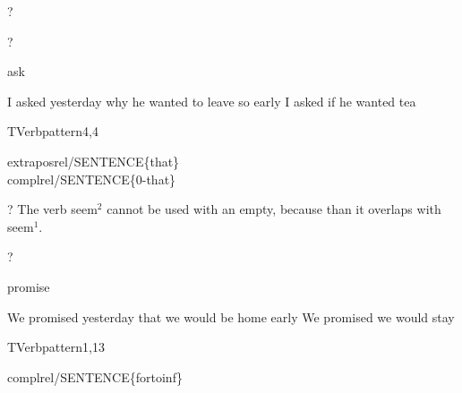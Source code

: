 \begin{thetadescr}
\evitem ?
\esitem
     \begin{examples}
        \example  ?
     \end{examples}
\end{thetadescr}


\begin{thetadescr}
\evitem ask
\esitem
     \begin{examples}
        \example I asked yesterday why he wanted to leave so early
        \example I asked if he wanted tea
     \end{examples}
\end{thetadescr}


\newpage
{}
\begin{vpattern}
 TVerbpattern4,4
\csritem \mbox{}\\
     \begin{csr}
     extraposrel/SENTENCE\{that\}\\
     complrel/SENTENCE\{0-that\}
     \end{csr}
\remarksitem
\end{vpattern}


\begin{thetadescr}
\evitem ? The verb seem$^{2}$ cannot be used with an empty, because than it 
overlaps with seem$^{1}$.
\esitem
     \begin{examples}
        \example  ?
     \end{examples}
\end{thetadescr}


\begin{thetadescr}
\evitem promise
\esitem
     \begin{examples}
        \example We promised yesterday that we would be home early
        \example We promised we would stay
     \end{examples}
\end{thetadescr}


\newpage
\verbpattern{[synFORTOSENT] }
\begin{vpattern}
 TVerbpattern1,13
\csritem \mbox{}\\
     \begin{csr}
      complrel/SENTENCE\{fortoinf\}
     \end{csr}
\remarksitem
\end{vpattern}

